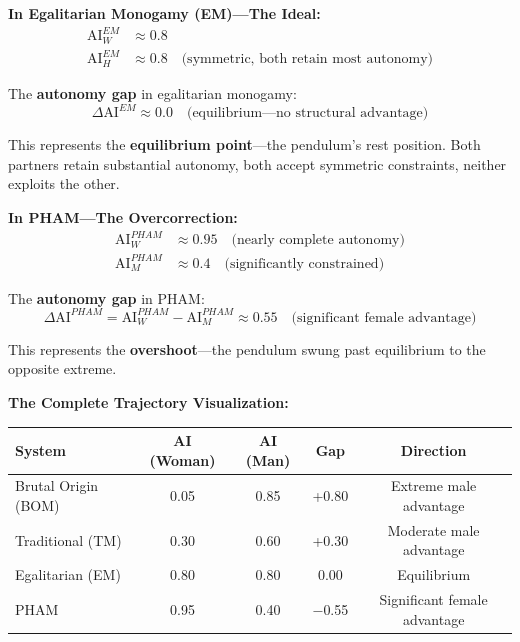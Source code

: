 \documentclass[12pt,openany]{book}
\numberwithin{equation}{chapter}
\begin{document}
\textbf{In Egalitarian Monogamy (EM)---The Ideal:}
\begin{align*}
\text{AI}_W^{EM} &\approx 0.8 \\
\text{AI}_H^{EM} &\approx 0.8 \quad \text{(symmetric, both retain most autonomy)}
\end{align*}

The \textbf{autonomy gap} in egalitarian monogamy:
\[
\Delta \text{AI}^{EM} \approx 0.0 \quad \text{(equilibrium---no structural advantage)}
\]

This represents the \textbf{equilibrium point}---the pendulum's rest position. Both partners retain substantial autonomy, both accept symmetric constraints, neither exploits the other.

\textbf{In PHAM---The Overcorrection:}
\begin{align*}
\text{AI}_W^{PHAM} &\approx 0.95 \quad \text{(nearly complete autonomy)} \\
\text{AI}_M^{PHAM} &\approx 0.4 \quad \text{(significantly constrained)}
\end{align*}

The \textbf{autonomy gap} in PHAM:
\[
\Delta \text{AI}^{PHAM} = \text{AI}_W^{PHAM} - \text{AI}_M^{PHAM} \approx 0.55 \quad \text{(significant female advantage)}
\]

This represents the \textbf{overshoot}---the pendulum swung past equilibrium to the opposite extreme.

\textbf{The Complete Trajectory Visualization:}

\begin{center}
\begin{tabular}{|l|c|c|c|c|}
\hline
\textbf{System} & \textbf{AI (Woman)} & \textbf{AI (Man)} & \textbf{Gap} & \textbf{Direction} \\
\hline
Brutal Origin (BOM) & 0.05 & 0.85 & +0.80 & Extreme male advantage \\
\hline
Traditional (TM) & 0.30 & 0.60 & +0.30 & Moderate male advantage \\
\hline
Egalitarian (EM) & 0.80 & 0.80 & 0.00 & Equilibrium \\
\hline
PHAM & 0.95 & 0.40 & $-$0.55 & Significant female advantage \\
\hline
\end{tabular}
\end{center}
\end{document}
